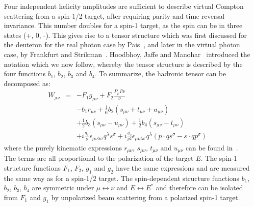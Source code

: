 %
%
%
%
%
%

Four independent  helicity amplitudes are
sufficient to describe virtual Compton scattering from a spin-1/2 target, after requiring parity
and time reversal invariance.  This number doubles  for
a spin-1 target, as the spin can be in three states (+, 0, -). 
This gives rise to a tensor structure which was first discussed for the deuteron for the real photon case
by Pais~\cite{Pais:1967zz}, %
and later in the virtual photon case, by Frankfurt and
Strikman~\cite{Frankfurt:1983qs}. %
Hoodbhoy, Jaffe and Manohar~\cite{Hoodbhoy:1988am}
introduced the notation which we now follow, whereby the tensor structure is described
by the four functions $b_1$, $b_2$, $b_3$ and $b_4$.
To summarize, the hadronic tensor can be decomposed as:
%
\begin{eqnarray}
W_{\mu\nu} &=& - F_1 g_{\mu\nu} + F_2 \frac{P_{\mu} P{\nu}}{\nu} \nonumber \\
          & & - b_1 r_{\mu\nu} + \frac{1}{6} b_2 (s_{\mu\nu} + t_{\mu\nu} + u_{\mu\nu}) \nonumber \\
          & & + \frac{1}{2} b_3 (s_{\mu\nu} - u_{\mu\nu}) + \frac{1}{2} b_4 (s_{\mu\nu} - t_{\mu\nu}) \nonumber \\
          & & + i \frac{g_1}{\nu} \epsilon_{\mu\nu\lambda\sigma} q^{\lambda} s^{\sigma} 
              + i \frac{g_2}{\nu^2} \epsilon_{\mu\nu\lambda\sigma} q^{\lambda} (p \cdot qs^{\sigma}  
              - s \cdot qp^{\sigma})
\label{had-tensor}
\end{eqnarray}
%
where the purely kinematic expressions  $r_{\mu\nu}$, $s_{\mu\nu}$, $t_{\mu\nu}$ and $u_{\mu\nu}$ can be 
found in~\cite{Hoodbhoy:1988am}. The terms are all proportional to the 
polarization of the target $E$. The spin-1 structure functions $F_1$, $F_2$, $g_1$ and 
$g_2$ have the same expressions and are measured the same way as for a spin-1/2 
target. The spin-dependent structure functions $b_1$, $b_2$, $b_3$, $b_4$ are 
symmetric under $\mu\leftrightarrow\nu$ and $E\leftrightarrow E^*$ and therefore can 
be isolated from $F_1$ and $g_1$ by unpolarized beam scattering from a polarized 
spin-1 target.


